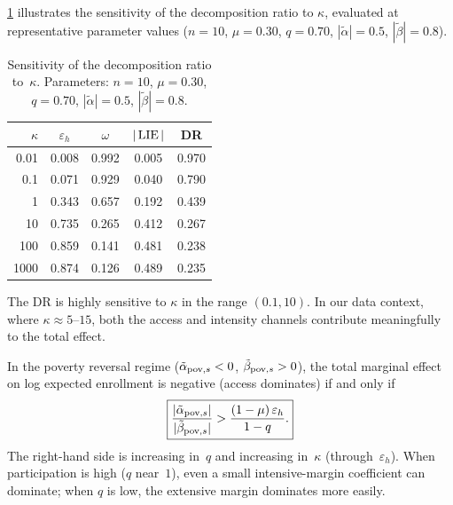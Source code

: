 \cref{sma:tab-DR} illustrates the sensitivity of the decomposition ratio to
$\kappa$, evaluated at representative parameter values
($n = 10$, $\mu = 0.30$, $q = 0.70$,
$|\tilde{\alpha}| = 0.5$, $|\tilde{\beta}| = 0.8$).

\begin{table}[ht]
\centering
\caption{Sensitivity of the decomposition ratio to~$\kappa$.
  Parameters: $n = 10$, $\mu = 0.30$, $q = 0.70$,
  $|\tilde{\alpha}| = 0.5$, $|\tilde{\beta}| = 0.8$.}
\label{sma:tab-DR}
\smallskip
\begin{tabular}{rcccc}
\toprule
$\kappa$ & $\varepsilon_h$ & $\omega$ & $|\operatorname{LIE}|$ & DR \\
\midrule
0.01  & 0.008 & 0.992 & 0.005 & 0.970 \\
0.1   & 0.071 & 0.929 & 0.040 & 0.790 \\
1     & 0.343 & 0.657 & 0.192 & 0.439 \\
10    & 0.735 & 0.265 & 0.412 & 0.267 \\
100   & 0.859 & 0.141 & 0.481 & 0.238 \\
1000  & 0.874 & 0.126 & 0.489 & 0.235 \\
\bottomrule
\end{tabular}
\end{table}

\begin{remark}\label{sma:rem-DR-sensitive}
  The DR is highly sensitive to $\kappa$ in the range $(0.1, 10)$.
  In our data context, where $\kappa \approx 5$--$15$, both the access and
  intensity channels contribute meaningfully to the total effect.
\end{remark}


\begin{proposition}
  \label{sma:prop-threshold}
  In the poverty reversal regime
  ($\tilde{\alpha}_{\textup{pov},s} < 0$,
   $\tilde{\beta}_{\textup{pov},s} > 0$),
  the total marginal effect on log expected enrollment is negative
  (access dominates) if and only if
  \begin{equation}\label{sma:eq-threshold}
    \boxed{
      \frac{|\tilde{\alpha}_{\textup{pov},s}|}
           {|\tilde{\beta}_{\textup{pov},s}|}
      > \frac{(1-\mu)\,\varepsilon_h}{1-q}.
    }
  \end{equation}
  The right-hand side is increasing in~$q$ and increasing in~$\kappa$
  (through~$\varepsilon_h$). When participation is high ($q$ near~$1$),
  even a small intensive-margin coefficient can dominate; when $q$ is low,
  the extensive margin dominates more easily.
\end{proposition}

